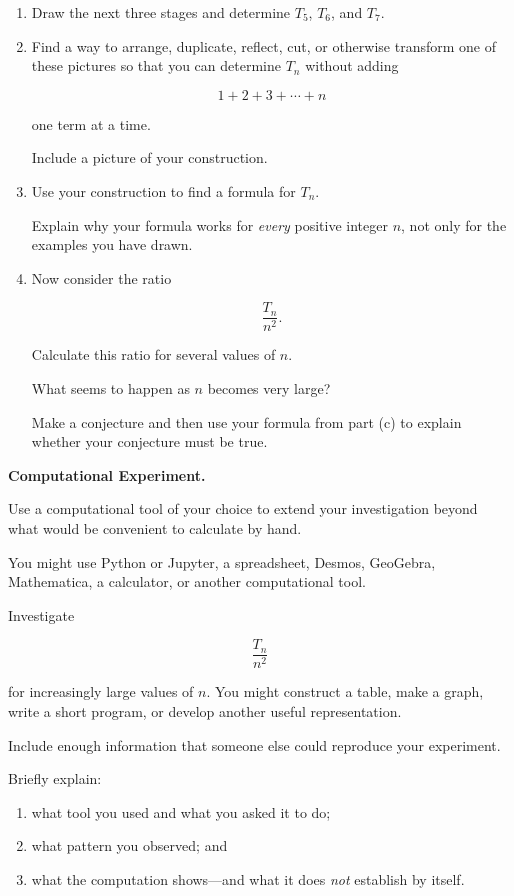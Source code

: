 \documentclass[11pt]{article}
\begin{document}
\begin{enumerate}[label=\textbf{\alph*.}, leftmargin=2em]

\item
Draw the next three stages and determine \(T_5\), \(T_6\), and \(T_7\).

\item
Find a way to arrange, duplicate, reflect, cut, or otherwise transform
one of these pictures so that you can determine \(T_n\) without adding

\[
1+2+3+\cdots+n
\]

one term at a time.

Include a picture of your construction.

\item
Use your construction to find a formula for \(T_n\).

Explain why your formula works for \emph{every} positive integer \(n\),
not only for the examples you have drawn.

\item
Now consider the ratio

\[
\frac{T_n}{n^2}.
\]

Calculate this ratio for several values of \(n\).

What seems to happen as \(n\) becomes very large?

Make a conjecture and then use your formula from part (c) to explain
whether your conjecture must be true.

\end{enumerate}

\begin{reflection}
\textbf{Computational Experiment.}

Use a computational tool of your choice to extend your investigation
beyond what would be convenient to calculate by hand.

You might use Python or Jupyter, a spreadsheet, Desmos, GeoGebra,
Mathematica, a calculator, or another computational tool.

Investigate

\[
\frac{T_n}{n^2}
\]

for increasingly large values of \(n\). You might construct a table,
make a graph, write a short program, or develop another useful
representation.

Include enough information that someone else could reproduce your
experiment.

Briefly explain:

\begin{enumerate}[label=\arabic*., leftmargin=2em]
    \item what tool you used and what you asked it to do;
    \item what pattern you observed; and
    \item what the computation shows---and what it does \emph{not}
    establish by itself.
\end{enumerate}
\end{reflection}
\end{document}
